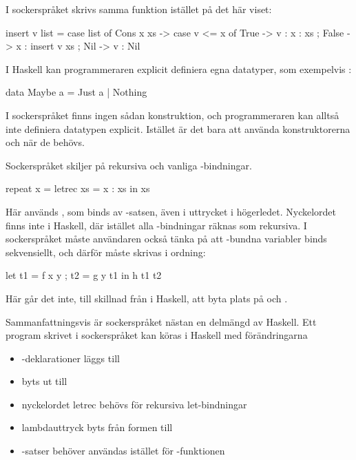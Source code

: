 \documentclass[Rapport]{subfiles}
\begin{document}
I sockerspråket skrivs samma funktion istället på det här viset:

\begin{codeEx}
  insert v list = case list of
      { Cons x xs -> case v <= x of
          { True  -> v : x : xs
          ; False -> x : insert v xs
          }
      ; Nil -> v : Nil
      }
\end{codeEx}

I Haskell kan programmeraren explicit definiera egna datatyper, som exempelvis :
    
\begin{codeEx}
data Maybe a = Just a | Nothing
\end{codeEx}

I sockerspråket finns ingen sådan konstruktion, och programmeraren kan alltså inte
definiera datatypen explicit. Istället är det bara att använda
konstruktorerna  och  när de behövs.


Sockerspråket skiljer på rekursiva och vanliga -bindningar. 

\begin{codeEx}
repeat x = letrec xs = x : xs in xs  
\end{codeEx}

Här används , som binds av -satsen, även i uttrycket i högerledet.
Nyckelordet  finns inte i Haskell, där istället alla -bindningar räknas som rekursiva. I
sockerspråket måste användaren också tänka på att -bundna variabler binds
sekvensiellt, och därför måste skrivas i ordning:

\begin{codeEx}
let { t1 = f x y
    ; t2 = g y t1
    }
in  h t1 t2
\end{codeEx}

Här går det inte, till skillnad från i Haskell, att byta plats på  och .

Sammanfattningsvis är sockerspråket nästan en delmängd av Haskell. Ett program
skrivet i sockerspråket kan köras i Haskell med förändringarna
\begin{itemize}
    \item {}-deklarationer läggs till
    \item \ic{(:)} byts ut till 
    \item nyckelordet letrec behövs för rekursiva let-bindningar
    \item lambdauttryck byts från formen  till 
    \item {}-satser behöver användas istället för -funktionen 
\end{itemize}
\end{document}
